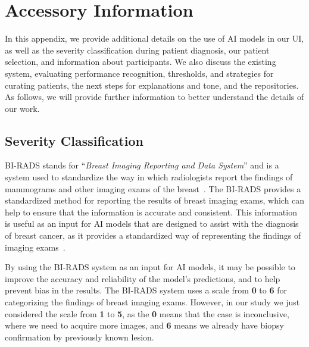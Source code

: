 \chapter{Accessory Information}
\label{chap:app001}

In this appendix, we provide additional details on the use of \ac{AI} models in our \ac{UI}, as well as the severity classification during patient diagnosis, our patient selection, and information about participants.
We also discuss the existing system, evaluating performance recognition, thresholds, and strategies for curating patients, the next steps for explanations and tone, and the repositories.
As follows, we will provide further information to better understand the details of our work.

\section{Severity Classification}
\label{sec:app001001}

\ac{BI-RADS} stands for ``{\it Breast Imaging Reporting and Data System}'' and is a system used to standardize the way in which radiologists report the findings of mammograms and other imaging exams of the breast~\cite{SPAK2017179, mckinney2020international}.
The \ac{BI-RADS} provides a standardized method for reporting the results of breast imaging exams, which can help to ensure that the information is accurate and consistent.
This information is useful as an input for \ac{AI} models that are designed to assist with the diagnosis of breast cancer, as it provides a standardized way of representing the findings of imaging exams~\cite{MAICAS2019101562}.

\clearpage

By using the \ac{BI-RADS} system as an input for \ac{AI} models, it may be possible to improve the accuracy and reliability of the model's predictions, and to help prevent bias in the results.
The \ac{BI-RADS} system uses a scale from {\bf 0} to {\bf 6} for categorizing the findings of breast imaging exams.
However, in our study we just considered the scale from {\bf 1} to {\bf 5}, as the {\bf 0} means that the case is inconclusive, where we need to acquire more images, and {\bf 6} means we already have biopsy confirmation by previously known lesion.

